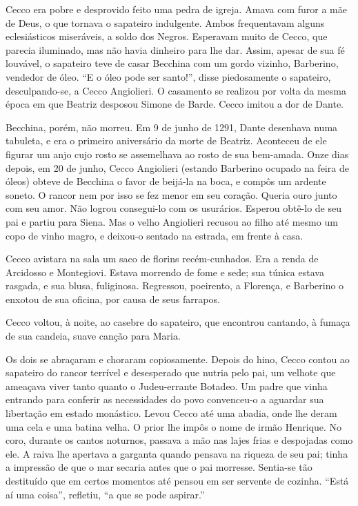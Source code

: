 Cecco era pobre e desprovido feito uma pedra de igreja. Amava com furor a
mãe de Deus, o que tornava o sapateiro indulgente. Ambos frequentavam
alguns eclesiásticos miseráveis, a soldo dos Negros. Esperavam muito de
Cecco, que parecia iluminado, mas não havia dinheiro para lhe dar. Assim,
apesar de sua fé louvável, o sapateiro teve de casar Becchina com um gordo
vizinho, Barberino, vendedor de óleo. “E o óleo pode ser santo!”, disse
piedosamente o sapateiro, desculpando-se, a Cecco Angiolieri. O casamento
se realizou por volta da mesma época em que Beatriz desposou Simone de
Barde. Cecco imitou a dor de Dante.

Becchina, porém, não morreu. Em 9 de junho de 1291, Dante desenhava numa
tabuleta, e era o primeiro aniversário da morte de Beatriz. Aconteceu de
ele figurar um anjo cujo rosto se assemelhava ao rosto de sua
bem-amada. Onze dias depois, em 20 de junho, Cecco Angiolieri (estando
Barberino ocupado na feira de óleos) obteve de Becchina o favor de
beijá-la na boca, e compôs um ardente soneto. O rancor nem por isso se fez
menor em seu coração. Queria ouro junto com seu amor. Não logrou
consegui-lo com os usurários. Esperou obtê-lo de seu pai e partiu para
Siena. Mas o velho Angiolieri recusou ao filho até mesmo um copo de vinho
magro, e deixou-o sentado na estrada, em frente à casa.

Cecco avistara na sala um saco de florins recém-cunhados. Era a renda de
Arcidosso e Montegiovi. Estava morrendo de fome e sede; sua túnica estava
rasgada, e sua blusa, fuliginosa. Regressou, poeirento, a Florença, e
Barberino o enxotou de sua oficina, por causa de seus farrapos.

Cecco voltou, à noite, ao casebre do sapateiro, que encontrou cantando, à
fumaça de sua candeia, suave canção para Maria.

Os dois se abraçaram e choraram copiosamente. Depois do hino, Cecco contou
ao sapateiro do rancor terrível e desesperado que nutria pelo pai, um
velhote que ameaçava viver tanto quanto o Judeu-errante Botadeo. Um padre
que vinha entrando para conferir as necessidades do povo convenceu-o a
aguardar sua libertação em estado monástico. Levou Cecco até uma abadia,
onde lhe deram uma cela e uma batina velha. O prior lhe impôs o nome de
irmão Henrique. No coro, durante os cantos noturnos, passava a mão nas
lajes frias e despojadas como ele. A raiva lhe apertava a garganta quando
pensava na riqueza de seu pai; tinha a impressão de que o mar secaria
antes que o pai morresse. Sentia-se tão destituído que em certos momentos
até pensou em ser servente de cozinha. “Está aí uma coisa'', refletiu, ``a que
se pode aspirar.”

